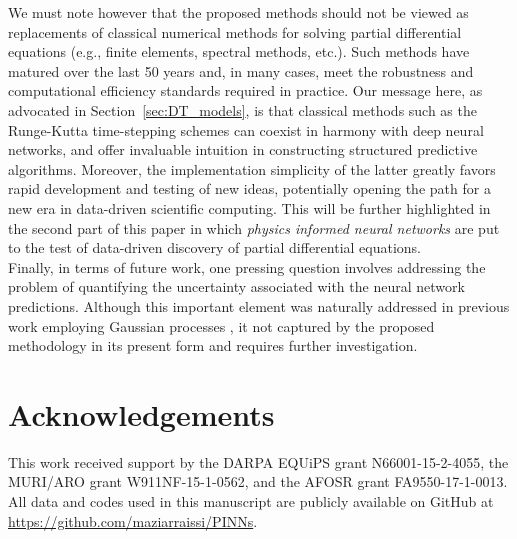 \documentclass[preprint,12pt]{elsarticle}
\begin{document}
We must note however that the proposed methods should not be viewed as replacements of classical numerical methods for solving partial differential equations (e.g., finite elements, spectral methods, etc.). Such methods have matured over the last 50 years and, in many cases, meet the robustness and computational efficiency standards required in practice. Our message here, as advocated in Section~\ref{sec:DT_models}, is that classical methods such as the Runge-Kutta time-stepping schemes can coexist in harmony with deep neural networks, and offer invaluable intuition in constructing structured predictive algorithms. Moreover, the implementation simplicity of the latter greatly favors rapid development and testing of new ideas, potentially opening the path for a new era in data-driven scientific computing. This will be further highlighted in the second part of this paper in which {\em physics informed neural networks} are put to the test of data-driven discovery of partial differential equations.\\

Finally, in terms of future work, one pressing question involves addressing the problem of quantifying the uncertainty associated with the neural network  predictions. Although this important element was naturally addressed in previous work employing Gaussian processes \cite{raissi2017numerical}, it not captured by the proposed methodology in its present form and requires further investigation.

\section*{Acknowledgements}
This work received support by the DARPA EQUiPS grant N66001-15-2-4055, the MURI/ARO grant W911NF-15-1-0562, and the AFOSR grant FA9550-17-1-0013. All data and codes used in this manuscript are publicly available on GitHub at \url{https://github.com/maziarraissi/PINNs}.

% 



\end{document}
